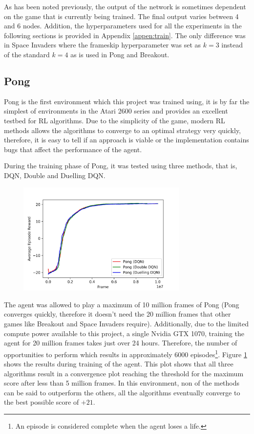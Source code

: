 As has been noted previously, the output of the network is sometimes dependent on the game that is currently being trained. The final output varies between 4 and 6 nodes. Addition, the hyperparameters used for all the experiments in the following sections is provided in Appendix \ref{appen:train}. The only difference was in Space Invaders where the frameskip hyperparameter was set as $k = 3$ instead of the standard $k = 4$ as is used in Pong and Breakout.

\subsection{Pong}
Pong is the first environment which this project was trained using, it is by far the simplest of environments in the Atari 2600 series and provides an excellent testbed for RL algorithms. Due to the simplicity of the game, modern RL methods allows the algorithms to converge to an optimal strategy very quickly, therefore, it is easy to tell if an approach is viable or the implementation contains bugs that affect the performance of the agent.

During the training phase of Pong, it was tested using three methods, that is, DQN, Double and Duelling DQN.

\begin{figure}[htbp]
  \centering
  \includegraphics[width=0.75\textwidth]{chapters/chapter5/images/pong_plot.jpg}
  \caption[Pong Training results]{
    \label{fig:pong-train-results}
  }
\end{figure}

The agent was allowed to play a maximum of 10 million frames of Pong (Pong converges quickly, therefore it doesn't need the 20 million frames that other games like Breakout and Space Invaders require). Additionally, due to the limited compute power available to this project, a single Nvidia GTX 1070, training the agent for 20 million frames takes just over 24 hours. Therefore, the number of opportunities to perform  which results in approximately 6000 episodes\footnote{An episode is considered complete when the agent loses a life.}. Figure \ref{fig:pong-train-results} shows the results during training of the agent. This plot shows that all three algorithms result in a convergence plot reaching the threshold for the maximum score after less than 5 million frames. In this environment, non of the methods can be said to outperform the others, all the algorithms eventually converge to the best possible score of $+21$.

